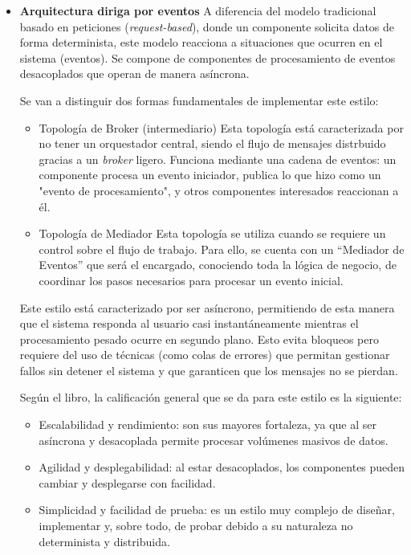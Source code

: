 \begin{itemize}
    \item \textbf{Arquitectura diriga por eventos} 
    \newline
    A diferencia del modelo tradicional basado en peticiones (\textit{request-based}), donde un componente solicita datos de forma 
    determinista, este modelo reacciona a situaciones que ocurren en el sistema (eventos). Se compone de componentes de procesamiento 
    de eventos desacoplados que operan de manera asíncrona. 

    Se van a distinguir dos formas fundamentales de implementar este estilo:

    \begin{itemize}
        \item Topología de Broker (intermediario)
        \newline
        Esta topología está caracterizada por no tener un orquestador central, siendo el flujo de mensajes distrbuido
        gracias a un \textit{broker} ligero. Funciona mediante una cadena de eventos: un componente procesa un evento 
        iniciador, publica lo que hizo como un "evento de procesamiento", y otros componentes interesados reaccionan a él.

        \item Topología de Mediador
        \newline
        Esta topología se utiliza cuando se requiere un control sobre el flujo de trabajo. Para ello, se cuenta con un
        ``Mediador de Eventos'' que será el encargado, conociendo toda la lógica de negocio, de coordinar los pasos 
        necesarios para procesar un evento inicial.        
    \end{itemize}

    Este estilo está caracterizado por ser asíncrono, permitiendo de esta manera que el sistema responda al usuario casi 
    instantáneamente mientras el procesamiento pesado ocurre en segundo plano. Esto evita bloqueos pero requiere del uso
    de técnicas (como colas de errores) que permitan gestionar fallos sin detener el sistema y que garanticen que los mensajes
    no se pierdan.

    Según el libro, la calificación general que se da para este estilo es la siguiente:

    \begin{itemize}
        \item Escalabilidad y rendimiento: son sus mayores fortaleza, ya que al ser asíncrona y desacoplada permite procesar 
        volúmenes masivos de datos.
        \item Agilidad y desplegabilidad: al estar desacoplados, los componentes pueden cambiar y desplegarse con facilidad.
        \item Simplicidad y facilidad de prueba: es un estilo muy complejo de diseñar, implementar y, sobre todo, de probar 
        debido a su naturaleza no determinista y distribuida.
    \end{itemize}


\end{itemize}
